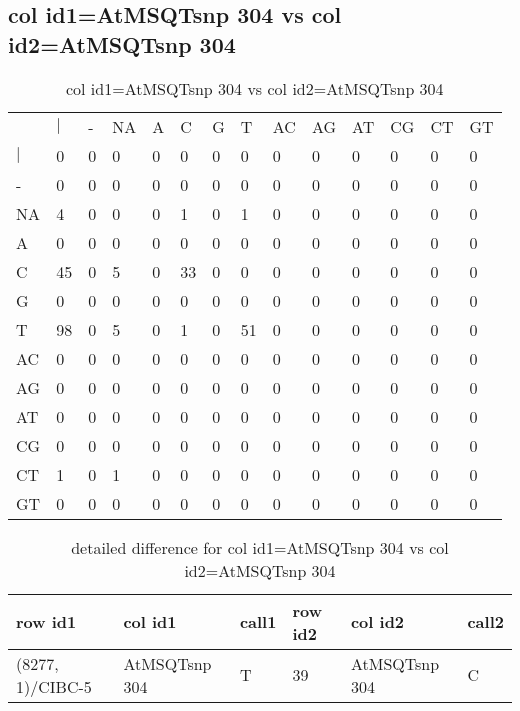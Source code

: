 \subsection{col id1=AtMSQTsnp 304 vs col id2=AtMSQTsnp 304}
\begin{center}
\begin{longtable}{|l|l|l|l|l|l|l|l|l|l|l|l|l|l|}
\caption{col id1=AtMSQTsnp 304 vs col id2=AtMSQTsnp 304} \label{table_dm648}\\
\hline
\\
\hline
&$|$&-&NA&A&C&G&T&AC&AG&AT&CG&CT&GT\\
$|$&0&0&0&0&0&0&0&0&0&0&0&0&0\\
-&0&0&0&0&0&0&0&0&0&0&0&0&0\\
NA&4&0&0&0&1&0&1&0&0&0&0&0&0\\
A&0&0&0&0&0&0&0&0&0&0&0&0&0\\
C&45&0&5&0&33&0&0&0&0&0&0&0&0\\
G&0&0&0&0&0&0&0&0&0&0&0&0&0\\
T&98&0&5&0&1&0&51&0&0&0&0&0&0\\
AC&0&0&0&0&0&0&0&0&0&0&0&0&0\\
AG&0&0&0&0&0&0&0&0&0&0&0&0&0\\
AT&0&0&0&0&0&0&0&0&0&0&0&0&0\\
CG&0&0&0&0&0&0&0&0&0&0&0&0&0\\
CT&1&0&1&0&0&0&0&0&0&0&0&0&0\\
GT&0&0&0&0&0&0&0&0&0&0&0&0&0\\
\hline
\end{longtable}
\end{center}

\begin{center}
\begin{longtable}{|l|l|l|l|l|l|}
\caption{detailed difference for col id1=AtMSQTsnp 304 vs col id2=AtMSQTsnp 304} \label{table_dm649}\\
\hline
row id1&col id1&call1&row id2&col id2&call2\\
\hline
(8277, 1)/CIBC-5&AtMSQTsnp 304&T&39&AtMSQTsnp 304&C\\
\hline
\end{longtable}
\end{center}

